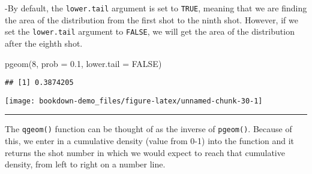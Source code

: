 \documentclass[
]{book}
\newenvironment{Shaded}{\begin{snugshade}}{\end{snugshade}}
\newcommand{\AttributeTok}[1]{\textcolor[rgb]{0.77,0.63,0.00}{#1}}
\newcommand{\CommentTok}[1]{\textcolor[rgb]{0.56,0.35,0.01}{\textit{#1}}}
\newcommand{\ConstantTok}[1]{\textcolor[rgb]{0.00,0.00,0.00}{#1}}
\newcommand{\DecValTok}[1]{\textcolor[rgb]{0.00,0.00,0.81}{#1}}
\newcommand{\FloatTok}[1]{\textcolor[rgb]{0.00,0.00,0.81}{#1}}
\newcommand{\FunctionTok}[1]{\textcolor[rgb]{0.00,0.00,0.00}{#1}}
\newcommand{\NormalTok}[1]{#1}
\newcommand{\SpecialCharTok}[1]{\textcolor[rgb]{0.00,0.00,0.00}{#1}}
\newcommand{\StringTok}[1]{\textcolor[rgb]{0.31,0.60,0.02}{#1}}
\begin{document}
-By default, the \texttt{lower.tail} argument is set to \texttt{TRUE}, meaning that we are finding the area of the distribution from the first shot to the ninth shot. However, if we set the \texttt{lower.tail} argument to \texttt{FALSE}, we will get the area of the distribution after the eighth shot.

\begin{Shaded}
\begin{Highlighting}[]
\FunctionTok{pgeom}\NormalTok{(}\DecValTok{8}\NormalTok{, }\AttributeTok{prob =} \FloatTok{0.1}\NormalTok{, }\AttributeTok{lower.tail =} \ConstantTok{FALSE}\NormalTok{)}
\end{Highlighting}
\end{Shaded}

\begin{verbatim}
## [1] 0.3874205
\end{verbatim}

\begin{Shaded}
\end{Shaded}

\begin{center}\texttt{[image: bookdown-demo\_files/figure-latex/unnamed-chunk-30-1]} \end{center}

\begin{center}\rule{0.5\linewidth}{0.5pt}\end{center}

The \texttt{qgeom()} function can be thought of as the inverse of \texttt{pgeom()}. Because of this, we enter in a cumulative density (value from 0-1) into the function and it returns the shot number in which we would expect to reach that cumulative density, from left to right on a number line.
\end{document}
